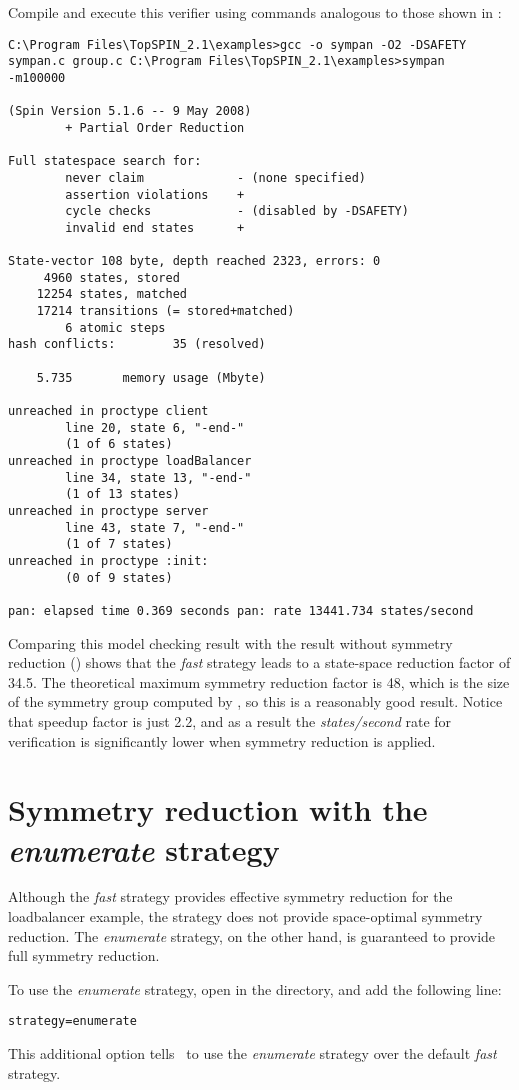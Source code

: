 Compile and execute this verifier using commands analogous to those
shown in :
%
\begin{lstlisting}
C:\Program Files\TopSPIN_2.1\examples>gcc -o sympan -O2 -DSAFETY
sympan.c group.c C:\Program Files\TopSPIN_2.1\examples>sympan
-m100000

(Spin Version 5.1.6 -- 9 May 2008)
        + Partial Order Reduction

Full statespace search for:
        never claim             - (none specified)
        assertion violations    +
        cycle checks            - (disabled by -DSAFETY)
        invalid end states      +

State-vector 108 byte, depth reached 2323, errors: 0
     4960 states, stored
    12254 states, matched
    17214 transitions (= stored+matched)
        6 atomic steps
hash conflicts:        35 (resolved)

    5.735       memory usage (Mbyte)

unreached in proctype client
        line 20, state 6, "-end-"
        (1 of 6 states)
unreached in proctype loadBalancer
        line 34, state 13, "-end-"
        (1 of 13 states)
unreached in proctype server
        line 43, state 7, "-end-"
        (1 of 7 states)
unreached in proctype :init:
        (0 of 9 states)

pan: elapsed time 0.369 seconds pan: rate 13441.734 states/second
\end{lstlisting}
%
Comparing this model checking result with the result without
symmetry reduction () shows that the
\emph{fast} strategy leads to a state-space reduction factor of
34.5.  The theoretical maximum symmetry reduction factor is 48,
which is the size of the symmetry group computed by \topspin, so
this is a reasonably good result.  Notice that speedup factor is
just 2.2, and as a result the \emph{states/second} rate for
verification is significantly lower when symmetry reduction is
applied.
%
\section{Symmetry reduction with the \emph{enumerate} strategy}\label{sec:example:enumerate}
%
Although the \emph{fast} strategy provides effective symmetry
reduction for the loadbalancer example, the strategy does not
provide space-optimal symmetry reduction. The \emph{enumerate}
strategy, on the other hand, is guaranteed to provide full symmetry
reduction.

To use the \emph{enumerate} strategy, open  in
the  directory, and add the following line:
%
\begin{lstlisting}
strategy=enumerate
\end{lstlisting}
%
This additional option tells \topspin\ to use the \emph{enumerate}
strategy over the default \emph{fast} strategy.

